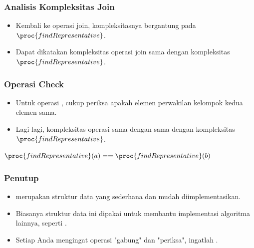 \begin{frame}
\frametitle{Analisis Kompleksitas Join}
\begin{itemize}
  \item Kembali ke operasi join, kompleksitasnya bergantung pada $\proc{findRepresentative}$.
  \item Dapat dikatakan kompleksitas operasi join sama dengan kompleksitas $\proc{findRepresentative}$.
\end{itemize}
\end{frame}

\begin{frame}
\frametitle{Operasi Check}
\begin{itemize}
  \item Untuk operasi , cukup periksa apakah elemen perwakilan kelompok kedua elemen sama.
  \item Lagi-lagi, kompleksitas operasi  sama dengan sama dengan kompleksitas $\proc{findRepresentative}$.
\end{itemize}
\begin{codebox}
\li   \Return $\proc{findRepresentative}(a) == \proc{findRepresentative}(b)$
\end{codebox}
\end{frame}

\begin{frame}
\frametitle{Penutup}
\begin{itemize}
  \item \pDjs merupakan struktur data yang sederhana dan mudah diimplementasikan.
  \item Biasanya struktur data ini dipakai untuk membantu implementasi algoritma lainnya, seperti .
  \item Setiap Anda mengingat operasi "gabung" dan "periksa", ingatlah \pdjs.
\end{itemize}
\end{frame}


